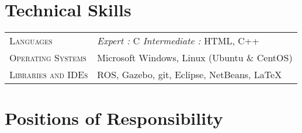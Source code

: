 \documentclass[a4paper,11pt]{extarticle} %
\begin{document}

\section{Technical Skills}

\begin{tabular}{R{3.0cm}|p{15.0cm}}
\textsc{Languages} & {\itshape{Expert : }}C {\itshape{Intermediate : }} HTML, C++\\
\textsc{Operating Systems} &  Microsoft Windows, Linux (Ubuntu \& CentOS)\\
\textsc{Libraries and IDEs} & ROS, Gazebo, git, Eclipse, NetBeans, LaTeX\\
\end{tabular}


\section{Positions of Responsibility}
\end{document}
